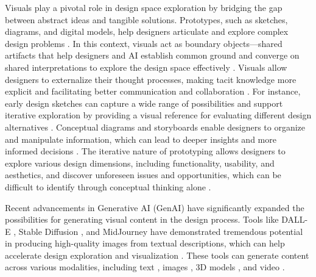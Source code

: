 Visuals play a pivotal role in design space exploration by bridging the gap between abstract ideas and tangible solutions. Prototypes, such as sketches, diagrams, and digital models, help designers articulate and explore complex design problems \cite{buxton2007sketching}. In this context, visuals act as boundary objects—shared artifacts that help designers and AI establish common ground and converge on shared interpretations to explore the design space effectively \cite{star1989structure, fischer2001articulating}. Visuals allow designers to externalize their thought processes, making tacit knowledge more explicit and facilitating better communication and collaboration \cite{gero1990design, card1999readings}. For instance, early design sketches can capture a wide range of possibilities and support iterative exploration by providing a visual reference for evaluating different design alternatives \cite{gero1990design}. Conceptual diagrams and storyboards enable designers to organize and manipulate information, which can lead to deeper insights and more informed decisions \cite{stolterman2010concept}. The iterative nature of prototyping allows designers to explore various design dimensions, including functionality, usability, and aesthetics, and discover unforeseen issues and opportunities, which can be difficult to identify through conceptual thinking alone \cite{dow2010parallel}. 

Recent advancements in Generative AI (GenAI) have significantly expanded the possibilities for generating visual content in the design process. Tools like DALL-E \cite{ramesh2021zero, ramesh2022hierarchical, betker2023improving}, Stable Diffusion \cite{rombach2022high}, and MidJourney have demonstrated tremendous potential in producing high-quality images from textual descriptions, which can help accelerate design exploration and visualization \cite{goodfellow2014generative, dhariwal2021diffusion, ramesh2022hierarchical}. These tools can generate content across various modalities, including text \cite{ouyang2022training, bai2022constitutional, touvron2023llama1, touvron2023llama2}, images \cite{ramesh2021zero, rombach2022high, saharia2022photorealistic, betker2023improving, chang2023muse, liu2023generative, liu2024logomotion}, 3D models \cite{poole2022dreamfusion, nichol2022point, gao2022get3d, lin2023magic3d, shi2023zero123++, zhou2024gala3d, liu2024one, liu2024one++}, and video \cite{singer2022make, ho2022imagen, villegas2022phenaki, kondratyuk2023videopoet, bar2024lumiere}.

